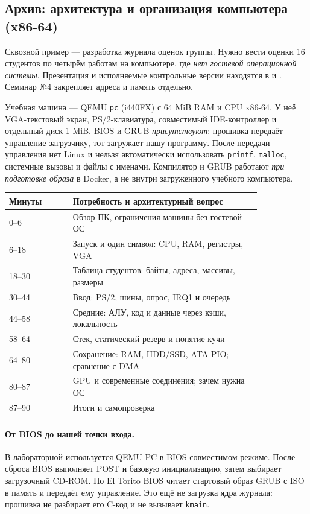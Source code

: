 \begingroup
\setlength{\emergencystretch}{2em}
\subsection*{Архив: архитектура и организация компьютера (x86-64)}
\label{lecture04-journal}
Сквозной пример --- разработка журнала оценок группы. Нужно вести оценки
16 студентов по четырём работам на компьютере, где \emph{нет гостевой
операционной системы}. Презентация и исполняемые контрольные версии
находятся в  и
. Семинар №4 закрепляет адреса и память отдельно.

Учебная машина --- QEMU \texttt{pc} (i440FX) с 64 MiB RAM и CPU x86-64.
У неё VGA-текстовый экран, PS/2-клавиатура, совместимый IDE-контроллер
и отдельный диск 1 MiB.
BIOS и GRUB \emph{присутствуют}: прошивка передаёт управление загрузчику,
тот загружает нашу программу. После передачи управления нет Linux и нельзя
автоматически использовать \texttt{printf}, \texttt{malloc}, системные вызовы
и файлы с именами. Компилятор и GRUB работают \emph{при подготовке образа}
в Docker, а не внутри загруженного учебного компьютера.

\begin{center}
\small
\begin{tabular}{|p{0.21\linewidth}|p{0.62\linewidth}|}
\hline
Минуты & Потребность и архитектурный вопрос \\
\hline
0--6 & Обзор ПК, ограничения машины без гостевой ОС \\
6--18 & Запуск и один символ: CPU, RAM, регистры, VGA \\
18--30 & Таблица студентов: байты, адреса, массивы, размеры \\
30--44 & Ввод: PS/2, шины, опрос, IRQ1 и очередь \\
44--58 & Средние: АЛУ, код и данные через кэши, локальность \\
58--64 & Стек, статический резерв и понятие кучи \\
64--80 & Сохранение: RAM, HDD/SSD, ATA PIO; сравнение с DMA \\
80--87 & GPU и современные соединения; зачем нужна ОС \\
87--90 & Итоги и самопроверка \\
\hline
\end{tabular}
\end{center}

\paragraph{От BIOS до нашей точки входа.}
В лабораторной используется QEMU PC в BIOS-совместимом режиме. После
сброса BIOS выполняет POST и базовую инициализацию, затем выбирает
загрузочный CD-ROM. По El Torito BIOS читает стартовый образ GRUB с ISO
в память и передаёт ему управление. Это ещё не загрузка ядра журнала:
прошивка не разбирает его C-код и не вызывает \texttt{kmain}.

